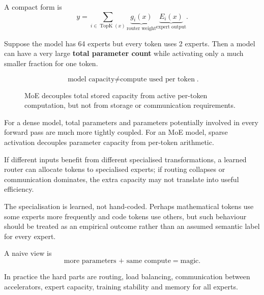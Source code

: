 A compact form is
\[
y
=
\sum_{i\in\operatorname{TopK}(x)}
\underbrace{g_i(x)}_{\text{router weight}}
\underbrace{E_i(x)}_{\text{expert output}}.
\]

Suppose the model has 64 experts but every token uses 2 experts.
Then a model can have a very large \textbf{total parameter count} while activating only a much smaller fraction for one token.

\[
\boxed{
\text{model capacity}
\neq
\text{compute used per token}
}.
\]

\begin{figure}[htbp]
\centering
{}
\caption{MoE decouples total stored capacity from active per-token computation, but not from storage or communication requirements.}
\label{fig:modern-moe-total-active}
\end{figure}

For a dense model, total parameters and parameters potentially involved in every forward pass are much more tightly coupled.
For an MoE model, sparse activation decouples parameter capacity from per-token arithmetic.

\begin{calloutbias}
If different inputs benefit from different specialised transformations, a learned router can allocate tokens to specialised experts; if routing collapses or communication dominates, the extra capacity may not translate into useful efficiency.
\end{calloutbias}

The specialisation is learned, not hand-coded.
Perhaps mathematical tokens use some experts more frequently and code tokens use others, but such behaviour should be treated as an empirical outcome rather than an assumed semantic label for every expert.

A naive view is
\[
\text{more parameters + same compute}=\text{magic}.
\]

In practice the hard parts are routing, load balancing, communication between accelerators, expert capacity, training stability and memory for all experts.

